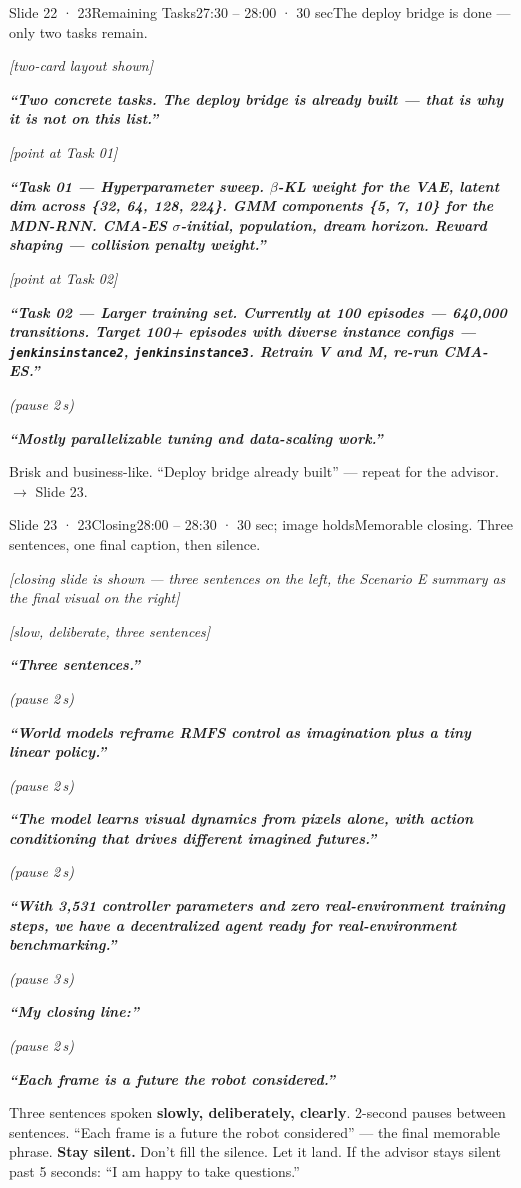 \documentclass[11pt,a4paper]{article}
\newcommand{\say}[1]{%
    \par\vspace{0.3em}%
    \begingroup
    \leftskip=12pt
    \rightskip=8pt
    \color{thStrong}%
    \itshape\textbf{“#1”}%
    \par
    \endgroup
    \vspace{0.2em}
}
\newcommand{\beat}[1][2]{%
    \par\textcolor{thMuted}{\small\textit{(pause #1\,s)}}\par
    \vspace{0.2em}
}
\newcommand{\stage}[1]{%
    \par\textcolor{thMuted}{\small\textit{[#1]}}\par
    \vspace{0.2em}
}
\newcommand{\emphw}[1]{\textbf{\textcolor{thAmber}{#1}}}
\begin{document}
\begin{slide}{Slide 22 · 23}{Remaining Tasks}{27:30 – 28:00 · 30 sec}{The deploy bridge is done — only two tasks remain.}
\stage{two-card layout shown}

\say{Two concrete tasks. \emphw{The deploy bridge is already built — that is why it is not on this list.}}

\stage{point at Task 01}

\say{\textbf{Task 01 — Hyperparameter sweep.} $\beta$-KL weight for the VAE, latent dim across \textbf{\{32, 64, 128, 224\}}. GMM components \textbf{\{5, 7, 10\}} for the MDN-RNN. CMA-ES $\sigma$-initial, population, dream horizon. Reward shaping — collision penalty weight.}

\stage{point at Task 02}

\say{\textbf{Task 02 — Larger training set.} Currently at 100 episodes — 640{,}000 transitions. Target 100+ episodes with diverse instance configs — \texttt{jenkinsinstance2}, \texttt{jenkinsinstance3}. Retrain V and M, re-run CMA-ES.}
\beat
\say{\emphw{Mostly parallelizable} tuning and data-scaling work.}

\begin{stagebox}
Brisk and business-like. ``Deploy bridge already built'' — repeat for the advisor. $\rightarrow$ Slide 23.
\end{stagebox}
\end{slide}

\begin{slide}{Slide 23 · 23}{Closing}{28:00 – 28:30 · 30 sec; image holds}{Memorable closing. Three sentences, one final caption, then silence.}
\stage{closing slide is shown — three sentences on the left, the Scenario E summary as the final visual on the right}
\stage{slow, deliberate, three sentences}

\say{Three sentences.}
\beat
\say{\textbf{World models reframe RMFS control as imagination plus a tiny linear policy.}}
\beat
\say{\textbf{The model learns visual dynamics from pixels alone, with action conditioning that drives different imagined futures.}}
\beat
\say{\textbf{With 3{,}531 controller parameters and zero real-environment training steps, we have a decentralized agent ready for real-environment benchmarking.}}
\beat[3]
\say{My closing line:}
\beat
\say{\textit{\textbf{Each frame is a future the robot considered.}}}

\begin{stagebox}
Three sentences spoken \textbf{slowly, deliberately, clearly}. 2-second pauses between sentences. ``Each frame is a future the robot considered'' — the final memorable phrase. \textbf{Stay silent.} Don't fill the silence. Let it land. If the advisor stays silent past 5 seconds: ``I am happy to take questions.''
\end{stagebox}
\end{slide}
\end{document}
